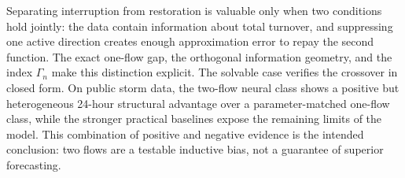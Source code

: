 Separating interruption from restoration is valuable only when two conditions hold jointly: the data contain information about total turnover, and suppressing one active direction creates enough approximation error to repay the second function. The exact one-flow gap, the orthogonal information geometry, and the index $\Gamma_n$ make this distinction explicit. The solvable case verifies the crossover in closed form. On public storm data, the two-flow neural class shows a positive but heterogeneous 24-hour structural advantage over a parameter-matched one-flow class, while the stronger practical baselines expose the remaining limits of the model. This combination of positive and negative evidence is the intended conclusion: two flows are a testable inductive bias, not a guarantee of superior forecasting.
